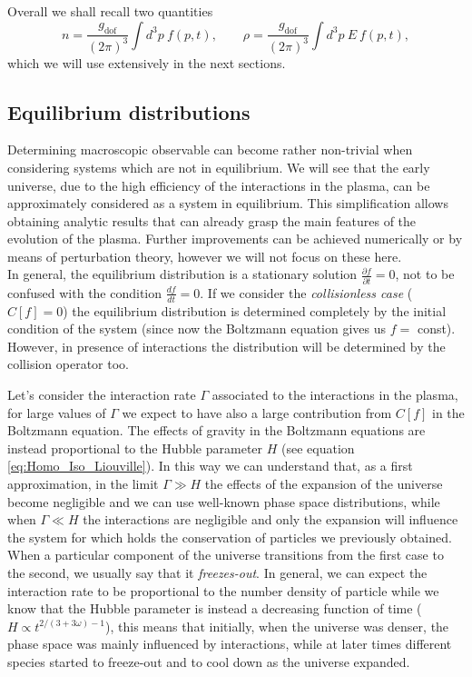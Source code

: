 Overall we shall recall two quantities
$$
n=\frac{g_\text{dof}}{(2\pi)^3}\int d^3p\ f(p,t),\qquad \rho=\frac{g_\text{dof}}{(2\pi)^3}\int d^3p\ E\ f(p,t),
$$
which we will use extensively in the next sections.
\subsection{Equilibrium distributions} \label{sec:EquilibriumDistributions}
Determining macroscopic observable can become rather non-trivial when considering systems which are not in equilibrium. We will see that the early universe, due to the high efficiency of the interactions in the plasma, can be approximately considered as a system in equilibrium. This simplification allows obtaining analytic results that can already grasp the main features of the evolution of the plasma. Further improvements can be achieved numerically or by means of perturbation theory, however we will not focus on these here.\\
In general, the equilibrium distribution is a stationary solution $\tfrac{\partial f}{\partial t}=0$, not to be confused with the condition $\tfrac{d f}{dt}=0$. If we consider the \emph{collisionless case} ($C[f]=0$) the equilibrium distribution is determined completely by the initial condition of the system (since now the Boltzmann equation gives us $f=$ const). However, in presence of interactions the distribution will be determined by the collision operator too. 

Let's consider the interaction rate $\Gamma$ associated to the interactions in the plasma, for large values of $\Gamma$ we expect to have also a large contribution from $C[f]$ in the Boltzmann equation. The effects of gravity in the Boltzmann equations are instead proportional to the Hubble parameter $H$ (see equation \eqref{eq:Homo_Iso_Liouville}). In this way we can understand that, as a first approximation, in the limit $\Gamma\gg H$ the effects of the expansion of the universe become negligible and we can use well-known phase space distributions, while when $\Gamma\ll H$ the interactions are negligible and only the expansion will influence the system for which holds the conservation of particles we previously obtained. When a particular component of the universe transitions from the first case to the second, we usually say that it \emph{freezes-out}. In general, we can expect the interaction rate to be proportional to the number density of particle while we know that the Hubble parameter is instead a decreasing function of time ($H\propto t^{2/(3+3\omega)-1}$), this means that initially, when the universe was denser, the phase space was mainly influenced by interactions, while at later times different species started to freeze-out and to cool down as the universe expanded.

